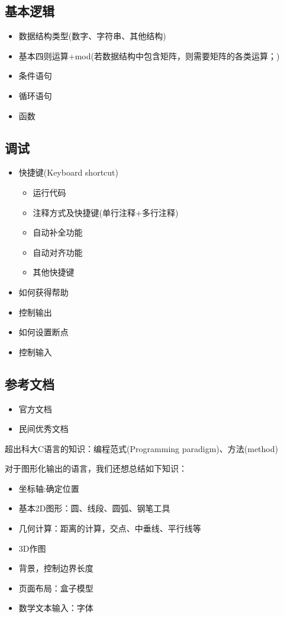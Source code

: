 \documentclass[11pt]{amsart}
\begin{document}
\subsection{基本逻辑}
\begin{itemize}
	\item 数据结构类型(数字、字符串、其他结构)
	\item 基本四则运算+mod(若数据结构中包含矩阵，则需要矩阵的各类运算；)
	\item 条件语句
	\item 循环语句
	\item 函数
\end{itemize}
\subsection{调试}
\begin{itemize}
	\item 快捷键(Keyboard shortcut)
	\begin{itemize}
		\item 运行代码
	\item 注释方式及快捷键(单行注释+多行注释)
	\item 自动补全功能
\item 自动对齐功能
		\item 其他快捷键	
	\end{itemize}
	\item 如何获得帮助
	\item 控制输出	
	\item 如何设置断点
	\item 控制输入


\end{itemize}
\subsection{参考文档}
\begin{itemize}
	\item 官方文档
	\item 民间优秀文档
\end{itemize}


超出科大C语言的知识：编程范式(Programming paradigm)、方法(method)

对于图形化输出的语言，我们还想总结如下知识：
\begin{itemize}
\item 坐标轴:确定位置
\item 基本2D图形：圆、线段、圆弧、钢笔工具
\item 几何计算：距离的计算，交点、中垂线、平行线等
\item 3D作图
\item 背景，控制边界长度
\item 页面布局：盒子模型
\item 数学文本输入：字体
\end{itemize}
\end{document}
